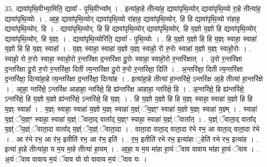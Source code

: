 \documentclass[17pt]{extarticle}
\begin{document}
35. द्यावा॑पृथि॒वीभ्या॒मिति॒ द्यावा᳚ - पृ॒थि॒वीभ्या᳚म् । . इत्या॑हा॒हे तीत्या॑ह॒ द्यावा॑पृथि॒व्योर् द्यावा॑पृथि॒व्यो रा॒हे तीत्या॑ह॒ द्यावा॑पृथि॒व्योः । . आ॒ह॒ द्यावा॑पृथि॒व्योर् द्यावा॑पृथि॒व्यो रा॑हाह॒ द्यावा॑पृथि॒व्योर्. हि हि द्यावा॑पृथि॒व्यो रा॑हाह॒ द्यावा॑पृथि॒व्योर्. हि । . द्यावा॑पृथि॒व्योर्. हि हि द्यावा॑पृथि॒व्योर् द्यावा॑पृथि॒व्योर्. हि य॒ज्ञो य॒ज्ञो हि द्यावा॑पृथि॒व्योर् द्यावा॑पृथि॒व्योर्. हि य॒ज्ञ्ः । . द्यावा॑पृथि॒व्योरिति॒ द्यावा᳚ - पृ॒थि॒व्योः । . हि य॒ज्ञो य॒ज्ञो हि हि य॒ज्ञ्ः स्वाहा॒ स्वाहा॑ य॒ज्ञो हि हि य॒ज्ञ्ः स्वाहा᳚ । . य॒ज्ञ्ः स्वाहा॒ स्वाहा॑ य॒ज्ञो य॒ज्ञ्ः स्वाहो॒ रो रु॒रोः स्वाहा॑ य॒ज्ञो य॒ज्ञ्ः स्वाहो॒रोः । . स्वाहो॒ रो रु॒रोः स्वाहा॒ स्वाहो॒रो र॒न्तरि॑क्षा द॒न्तरि॑क्षा दु॒रोः स्वाहा॒ स्वाहो॒रो र॒न्तरि॑क्षात् । . उ॒रो र॒न्तरि॑क्षा द॒न्तरि॑क्षा दु॒रो रु॒रो र॒न्तरि॑क्षा॒ दिती त्य॒न्तरि॑क्षा दु॒रो रु॒रो र॒न्तरि॑क्षा॒ दिति॑ । . अ॒न्तरि॑क्षा॒ दिती त्य॒न्तरि॑क्षा द॒न्तरि॑क्षा॒ दित्या॑हा॒हे त्य॒न्तरि॑क्षा द॒न्तरि॑क्षा॒ दित्या॑ह । . इत्या॑हा॒हे तीत्या॑ हा॒न्तरि॑क्षे॒ ऽन्तरि॑क्ष आ॒हे तीत्या॑ हा॒न्तरि॑क्षे । . आ॒हा॒ न्तरि॑क्षे॒ ऽन्तरि॑क्ष आहाहा॒ न्तरि॑क्षे॒ हि ह्य॑न्तरि॑क्ष आहाहा॒ न्तरि॑क्षे॒ हि । . अ॒न्तरि॑क्षे॒ हि ह्य॑न्तरि॑क्षे॒ ऽन्तरि॑क्षे॒ हि य॒ज्ञो य॒ज्ञो ह्य॑न्तरि॑क्षे॒ ऽन्तरि॑क्षे॒ हि य॒ज्ञ्ः । . हि य॒ज्ञो य॒ज्ञो हि हि य॒ज्ञ्ः स्वाहा॒ स्वाहा॑ य॒ज्ञो हि हि य॒ज्ञ्ः स्वाहा᳚ । . य॒ज्ञ्ः स्वाहा॒ स्वाहा॑ य॒ज्ञो य॒ज्ञ्ः स्वाहा॑ य॒ज्ञ्ं ॅय॒ज्ञ्ꣳ स्वाहा॑ य॒ज्ञो य॒ज्ञ्ः स्वाहा॑ य॒ज्ञ्म् । . स्वाहा॑ य॒ज्ञ्ं ॅय॒ज्ञ्ꣳ स्वाहा॒ स्वाहा॑ य॒ज्ञ्ं ॅवाता॒द् वाता᳚द् य॒ज्ञ्ꣳ स्वाहा॒ स्वाहा॑ य॒ज्ञ्ं ॅवाता᳚त् । . य॒ज्ञ्ं ॅवाता॒द् वाता᳚द् य॒ज्ञ्ं ॅय॒ज्ञ्ं ॅवाता॒दा वाता᳚द् य॒ज्ञ्ं ॅय॒ज्ञ्ं ॅवाता॒दा । . वाता॒दा वाता॒द् वाता॒दा र॑भे रभ॒ आ वाता॒द् वाता॒दा र॑भे । . आ र॑भे रभ॒ आ र॑भ॒ इतीति॑ रभ॒ आ र॑भ॒ इति॑ । . र॒भ॒ इतीति॑ रभे रभ॒ इत्या॑हा ॒हेति॑ रभे रभ॒ इत्या॑ह । . इत्या॑ हा॒हे तीत्या॑हा॒ य म॒य मा॒हे तीत्या॑ हा॒यम् । . आ॒हा॒ य म॒य मा॑हा हा॒यं ॅवाव वावाय मा॑हा हा॒यं ॅवाव । . अ॒यं ॅवाव वावाय म॒यं ॅवाव यो यो वावाय म॒यं ॅवाव यः । \newline
\pagebreak
{}
\end{document}
